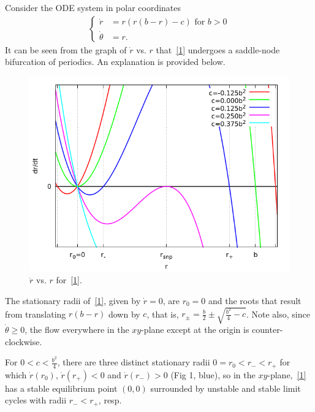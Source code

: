 \documentclass[a4paper,11pt]{article}
\begin{document}
Consider the ODE system in polar coordinates
\begin{align}\label{1}
\left\{\begin{array}{ll}
\dot{r}&=r(r(b-r)-c)\text{ for }b>0\\
\dot{\theta}&=r.
\end{array}\right.
\end{align}
It can be seen from the graph of $\dot{r}$ vs. $r$  that~\eqref{1} undergoes a saddle-node bifurcation of periodics. An explanation is provided below.
\begin{center}
\begin{figure}[H]
  \centering
    \includegraphics[scale=.49]{gnuplot/fig1.png}
 \caption{$\dot{r}$ vs. $r$ for~\eqref{1}.}
\label{fig1}
\end{figure}
\end{center}
The stationary radii of~\eqref{1}, given by $\dot{r}=0$, are $r_0=0$ and the roots that result from translating $r(b-r)$ down by $c$, that is, $r_{\pm}=\frac{b}2\pm\sqrt{\frac{b^2}4-c}$. Note also, since $\dot{\theta}\geq0$, the flow everywhere in the $xy$-plane except at the origin is counter-clockwise.\vspace{3mm}

\noindent
For $0<c<\frac{b^2}4$, there are three distinct stationary radii $0=r_0<r_-<r_+$ for which $\dot{r}(r_0)$, $\dot{r}(r_+)<0$ and $\dot{r}(r_-)>0$ (Fig 1, blue), so in the $xy$-plane,~\eqref{1} has a stable equilibrium point $(0,0)$ surrounded by unstable and stable limit cycles with radii $r_-<r_+$, resp.\vspace{3mm}
\end{document}
